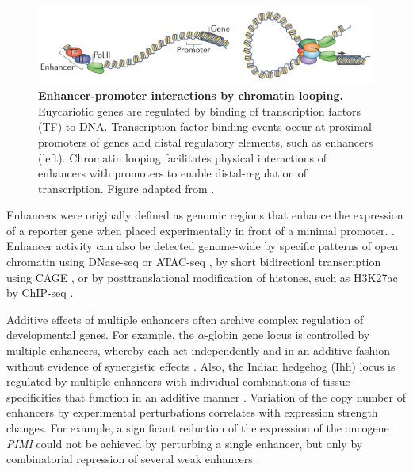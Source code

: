 \documentclass[a4paper,twoside=true,openright,parskip=full,chapterprefix=true,11pt,headings=normal,bibliography=totoc,listof=totoc,titlepage=on,captions=tableabove,draft=false]{scrreprt}
\theoremstyle{definition}
\theoremstyle{definition}
\theoremstyle{definition}
\theoremstyle{remark}
\begin{document}
\begin{figure}

{\centering \includegraphics[width=0.8\linewidth]{figures/Pombo2015fig1a} 

}

\caption{\textbf{Enhancer-promoter interactions by
chromatin looping.} Euycariotic genes are regulated by binding of
transcription factors (TF) to DNA. Transcription factor binding events
occur at proximal promoters of genes and distal regulatory elements,
such as enhancers (left). Chromatin looping facilitates physical
interactions of enhancers with promoters to enable distal-regulation of
transcription. Figure adapted from \citep{Pombo2015}.}\label{fig:EnhancerLooping}
\end{figure}









Enhancers were originally defined as genomic regions that enhance the
expression of a reporter gene when placed experimentally in front of a
minimal promoter. \citep{Banerji1981, Shlyueva2014}. Enhancer activity
can also be detected genome-wide by specific patterns of open chromatin
using DNase-seq \citep{Song2010} or ATAC-seq \citep{Buenrostro2013}, by
short bidirectionl transcription using CAGE \citep{Andersson2014}, or by
posttranslational modification of histones, such as H3K27ac by ChIP-seq
\citep{Creyghton2010}.

Additive effects of multiple enhancers often archive complex regulation
of developmental genes. For example, the \(\alpha\)-globin gene locus is
controlled by multiple enhancers, whereby each act independently and in
an additive fashion without evidence of synergistic effects
\citep{Hay2016}. Also, the Indian hedgehog (Ihh) locus is regulated by
multiple enhancers with individual combinations of tissue specificities
that function in an additive manner \citep{Will2017}. Variation of the
copy number of enhancers by experimental perturbations correlates with
expression strength changes. For example, a significant reduction of the
expression of the oncogene \emph{PIMI} could not be achieved by
perturbing a single enhancer, but only by combinatorial repression of
several weak enhancers \citep{Xie2017}.
\end{document}
